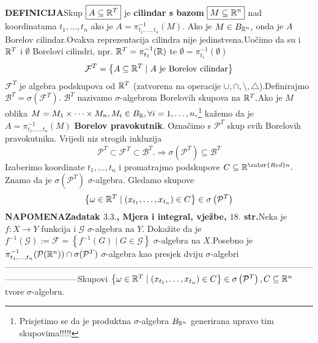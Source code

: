 \documentclass{article}
\begin{document}
\textbf{DEFINICIJA}\newline Skup \(\boxed{A\subseteq\Bbb R^T}\) je \textbf{cilindar s bazom} \(\boxed{M\subseteq\Bbb R^n}\) nad koordinatama \(t_1,\ldots,t_n\) ako je \(A=\pi_{t_1,\ldots,t_n}^{-1}(M).\) Ako je \(M\in B_{\Bbb R^n},\) onda je \(A\) Borelov cilindar.\newline Ovakva reprezentacija cilindra nije jedinstvena.\newline Uočimo da su i \(\Bbb R^T\) i \(\emptyset\) Borelovi cilindri, npr. \(\Bbb R^T=\pi_{t_1}^{-1}(\Bbb R)\) te \(\emptyset=\pi_{t_1}^{-1}(\emptyset)\) \[\mathcal F^T=\left\{A\subseteq\Bbb R^T\mid A\text{ je Borelov cilindar}\right\}\] \(\mathcal F^T\) je algebra podskupova od \(\Bbb R^T\) (zatvorena na operacije \(\cup,\cap,\setminus,\triangle\)).\newline Definirajmo \(\mathcal B^T=\sigma\left(\mathcal F^T\right).\) \(\mathcal B^T\) nazivamo \(\sigma\)-algebrom Borelovih skupova na \(\Bbb R^T.\)\newline Ako je \(M\) oblika \(M=M_1\times\cdots\times M_n, M_i\in B_{\Bbb R},\forall i=1,\ldots,n,\)\footnote[6]{Prisjetimo se da je produktna \(\sigma\)-algebra \(B_{\Bbb R^n}\) generirana upravo tim skupovima!!!!!} kažemo da je \(A=\pi_{t_1,\ldots,t_n}^{-1}(M)\) \textbf{Borelov pravokutnik}. Označimo s \(\mathcal P^T\) skup svih Borelovih pravokutnika. Vrijedi niz strogih inkluzija \[\mathcal P^T\subset\mathcal F^T\subset\mathcal B^T.\Rightarrow\sigma\left(\mathcal P^T\right)\subseteq\mathcal B^T\]
Izaberimo koordinate \(t_1,\ldots,t_n\) i promatrajmo podskupove \(C\subseteq\Bbb R^{\color{Red}n}.\) Znamo da je \(\sigma\left(\mathcal P^T\right)\) \(\sigma\)-algebra. Gledamo skupove \[\left\{\omega\in\Bbb R^T\mid(x_{t_1},\ldots,x_{t_n})\in C\right\}\in\sigma\left(\mathcal P^T\right)\] 
\textbf{NAPOMENA}\newline \textbf{Zadatak \(3.3.\), Mjera i integral, vježbe, \(18.\) str.}\newline Neka je \(f:X\to Y\) funkcija i \(\mathcal G\) \(\sigma\)-algebra na \(Y.\) Dokažite da je  \(f^{-1}(\mathcal G):=\mathcal F=\left\{f^{-1}(G)\mid G\in\mathcal G\right\}\) \(\sigma\)-algebra na \(X.\)\newline Posebno je \(\pi_{t_1,\ldots,t_n}^{-1}(\mathcal P(\Bbb R^n))\cap\sigma(\mathcal P^T)\) \(\sigma\)-algebra kao presjek dviju \(\sigma\)-algebri\newline\newline--------------------------------------------------------------------------------------------------------------------------------------\newline\newline Skupovi \(\left\{\omega\in\Bbb R^T\mid (x_{t_1},\ldots,x_{t_n})\in C\right\}\in\sigma\left(\mathcal P^T\right),C\subseteq\Bbb R^n\)  tvore \(\sigma\)-algebru.
\end{document}
